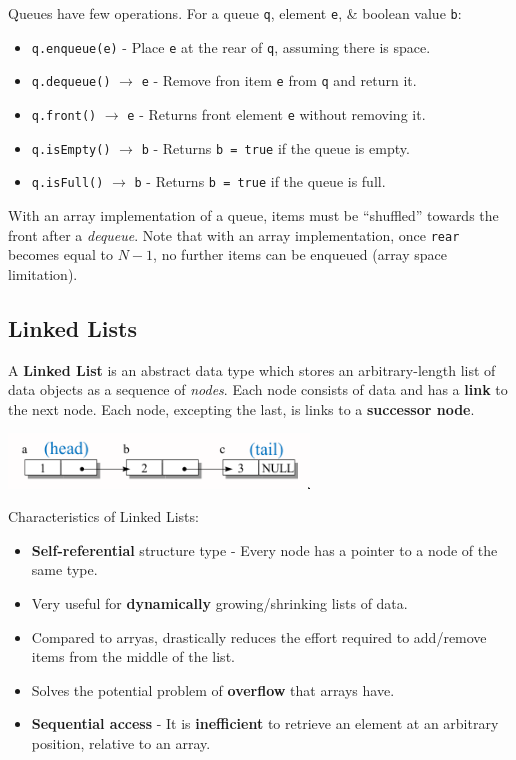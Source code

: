 \documentclass[11pt]{article}
\begin{document}
Queues have few operations. 
For a queue \verb|q|, element \verb|e|, \& boolean value \verb|b|: 
\begin{itemize}
    \item \verb|q.enqueue(e)| - Place \verb|e| at the rear of \verb|q|, assuming there is space. 
    \item \verb|q.dequeue()| $\rightarrow$ \verb|e| - Remove fron item \verb|e| from \verb|q| and return it. 
    \item \verb|q.front()| $\rightarrow$ \verb|e| - Returns front element \verb|e| without removing it. 
    \item \verb|q.isEmpty()| $\rightarrow$ \verb|b| - Returns \verb|b = true| if the queue is empty. 
    \item \verb|q.isFull()| $\rightarrow$ \verb|b| - Returns \verb|b = true| if the queue is full. 
\end{itemize}

With an array implementation of a queue, items must be ``shuffled'' towards the front after a \textit{dequeue}. 
Note that with an array implementation, once \verb|rear| becomes equal to $N-1$, no further items can be enqueued (array space limitation). 

\subsection{Linked Lists}
A \textbf{Linked List} is an abstract data type which stores an arbitrary-length list of data objects as a sequence of \textit{nodes}. 
Each node consists of data and has a \textbf{link} to the next node. 
Each node, excepting the last, is links to a \textbf{successor node}. 

\begin{center}
    \includegraphics[width=0.6\textwidth]{ll.png}
\end{center}

Characteristics of Linked Lists:
\begin{itemize} 
    \item   \textbf{Self-referential} structure type - Every node has a pointer to a node of the same type. 
    \item   Very useful for \textbf{dynamically} growing/shrinking lists of data. 
    \item   Compared to arryas, drastically reduces the effort required to add/remove items from the middle of the list.
    \item   Solves the potential problem of \textbf{overflow} that arrays have. 
    \item   \textbf{Sequential access} - It is \textbf{inefficient} to retrieve an element at an arbitrary position, relative to an array. 
\end{itemize}
\end{document}
